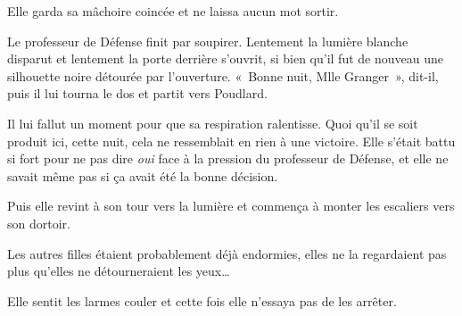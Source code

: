 Elle garda sa mâchoire coincée et ne laissa aucun mot sortir.

Le professeur de Défense finit par soupirer. Lentement la lumière blanche disparut et lentement la porte derrière s'ouvrit, si bien qu'il fut de nouveau une silhouette noire détourée par l'ouverture. «~Bonne nuit, Mlle Granger~», dit-il, puis il lui tourna le dos et partit vers Poudlard.

Il lui fallut un moment pour que sa respiration ralentisse. Quoi qu'il se soit produit ici, cette nuit, cela ne ressemblait en rien à une victoire. Elle s'était battu si fort pour ne pas dire \emph{oui} face à la pression du professeur de Défense, et elle ne savait même pas si ça avait été la bonne décision.

Puis elle revint à son tour vers la lumière et commença à monter les escaliers vers son dortoir.

Les autres filles étaient probablement déjà endormies, elles ne la regardaient pas plus qu'elles ne détourneraient les yeux…

Elle sentit les larmes couler et cette fois elle n'essaya pas de les arrêter.
